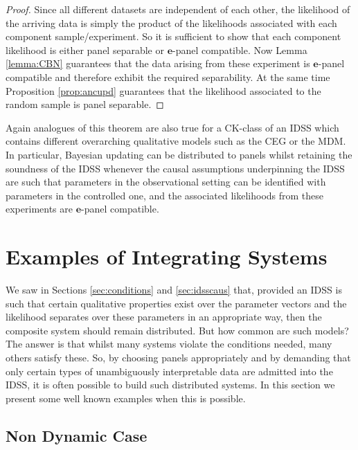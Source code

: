 \begin{proof}
 Since all different datasets are independent of each other, the likelihood of the arriving data is simply the product of the likelihoods associated with each component sample/experiment. So it is sufficient to show that each component likelihood is either panel separable or $\bm{e}$-panel compatible. Now Lemma \ref{lemma:CBN} guarantees that the data arising from these experiment is $\bm{e}$-panel compatible and therefore exhibit the required separability. At the same time Proposition \ref{prop:ancupd} guarantees that the likelihood associated to the random sample is panel separable. 
\end{proof}

Again analogues of this theorem are also true for  a CK-class of an IDSS which contains different overarching qualitative models such as the CEG or the MDM. In particular, Bayesian updating can be distributed to panels whilst retaining the soundness of the IDSS whenever the causal assumptions underpinning the IDSS are such that parameters in the observational setting can be identified with parameters in the controlled one, and the associated likelihoods from these experiments are $\bm{e}$-panel compatible.

\section{Examples of Integrating Systems}
\label{sec:idssex}
We saw in Sections \ref{sec:conditions} and \ref{sec:idsscaus} that, provided an IDSS is such that certain qualitative properties exist over the parameter vectors and the likelihood  separates over these parameters in an appropriate way, then the composite system should remain distributed. But how common are such models? The answer is that whilst many systems violate the conditions needed, many others satisfy these. So, by choosing panels appropriately and by demanding that only certain types of unambiguously interpretable data are admitted into the IDSS, it is often possible to build such distributed systems. In this section we present some well known examples when this is possible. 

\subsection{Non Dynamic Case}
\label{sec:nondymidss}

